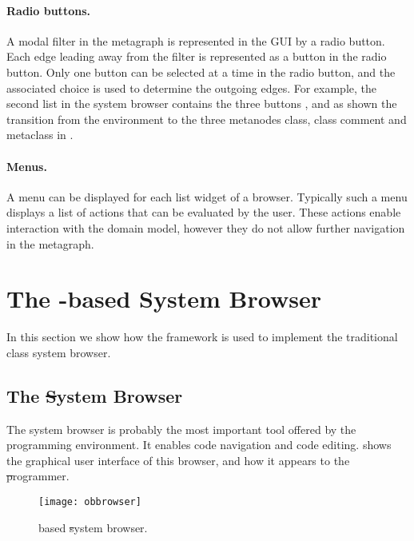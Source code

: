 \documentclass[a4paper,10pt,twoside]{book}
\begin{document}
\paragraph{Radio buttons.} A modal filter in the metagraph is represented in the GUI by a radio button. Each edge leading away from the filter is represented as a button in the radio button. Only one button can be selected at a time in the radio button, and the associated choice is used to determine the outgoing edges. For example, the second list in the system browser contains the three buttons ,  and  as shown the transition from the environment to the three metanodes class, class comment and metaclass in .

\paragraph{Menus.} A menu can be displayed for each list widget of a browser. Typically such a menu displays a list of actions that can be evaluated by the user. These actions enable interaction with the domain model, however they do not allow further navigation in the metagraph.






\section{The \ob-based System Browser} 

In this section we show how the framework is used to implement the traditional class system browser. 

\subsection{The \st System Browser}
The system browser is probably the most important tool offered by the \pharo programming environment. It enables code navigation and code editing.  shows the graphical user interface of this browser, and how it appears to the \st programmer. 


\begin{figure}[!ht]
\begin{center}
\texttt{[image: obbrowser]}
\caption{\ob based \st system browser.} 
\end{center}
\end{figure}
\end{document}
